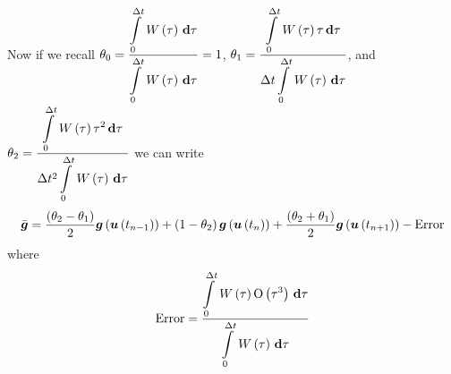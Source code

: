 Now if we recall $\theta_{0}=\dfrac{\gint{0}{\Delta
    t}{\fnof{W}{\tau}}{\tau}}{\gint{0}{\Delta t}{\fnof{W}{\tau}}{\tau}}=1$,
$\theta_{1}=\dfrac{\gint{0}{\Delta t}{\fnof{W}{\tau}\tau}{\tau}}{\Delta
  t\gint{0}{\Delta t}{\fnof{W}{\tau}}{\tau}}$, and
$\theta_{2}=\dfrac{\gint{0}{\Delta t}{\fnof{W}{\tau}\tau^{2}}{\tau}}{\Delta
  t^{2}\gint{0}{\Delta t}{\fnof{W}{\tau}}{\tau}}$ we can write
\begin{equation}
  \bar{\vectr{g}}=
  \dfrac{\pbrac{\theta_{2}-\theta_{1}}}{2}\fnof{\vectr{g}}{\fnof{\vectr{u}}{t_{n-1}}}+
  \pbrac{1-\theta_{2}}\fnof{\vectr{g}}{\fnof{\vectr{u}}{t_{n}}}+
  \dfrac{\pbrac{\theta_{2}+\theta_{1}}}{2}\fnof{\vectr{g}}{\fnof{\vectr{u}}{t_{n+1}}}-\text{Error}
\end{equation}
where
\begin{equation}
  \text{Error}=\dfrac{\gint{0}{\Delta t}{\fnof{W}{\tau}\orderof{\tau^{3}}}{\tau}}{
    \gint{0}{\Delta t}{\fnof{W}{\tau}}{\tau}}
\end{equation}

